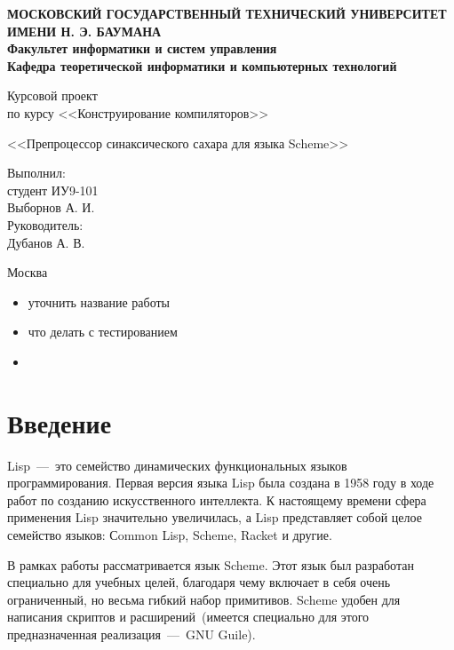 \documentclass[12pt,a4paper,oneside]{extarticle}
\begin{document}
\pgfplotsset{compat=1.8}

\thispagestyle{empty}
\newpage
{
\centering


\textbf{
МОСКОВСКИЙ ГОСУДАРСТВЕННЫЙ ТЕХНИЧЕСКИЙ УНИВЕРСИТЕТ ИМЕНИ Н. Э. БАУМАНА \\
Факультет информатики и систем управления \\
Кафедра теоретической информатики и компьютерных технологий}
\bigskip
\bigskip
\bigskip
\bigskip
\bigskip
\bigskip
\bigskip

\vfill


Курсовой проект \\
по курсу <<Конструирование компиляторов>>

\bigskip

{\large <<Препроцессор синаксического сахара для языка Scheme>>}
\bigskip

\vfill



\hfill\parbox{4cm} {
Выполнил:\\
студент ИУ9-101 \hfill \\
Выборнов А. И.\hfill \medskip\\
Руководитель:\\
Дубанов А. В.\hfill
}


\vspace{\fill}

Москва \number\year
\clearpage
}


\tableofcontents

\clearpage

\begin{itemize}
    \item уточнить название работы
    \item что делать с тестированием
    \item
\end{itemize}

\clearpage

\section*{Введение}
    Lisp~---~это семейство динамических функциональных языков программирования.
    Первая версия языка Lisp была создана в 1958 году в ходе работ по созданию искусственного интеллекта.
    К настоящему времени сфера применения Lisp значительно увеличилась, а Lisp представляет собой целое семейство языков: Сommon Lisp, Scheme, Racket и другие. 

    В рамках работы рассматривается язык Scheme.
    Этот язык был разработан специально для учебных целей, благодаря чему включает в себя очень ограниченный, но весьма гибкий набор примитивов.
    Scheme удобен для написания скриптов и расширений~(имеется специально для этого предназначенная реализация~---~GNU Guile).
\end{document}
